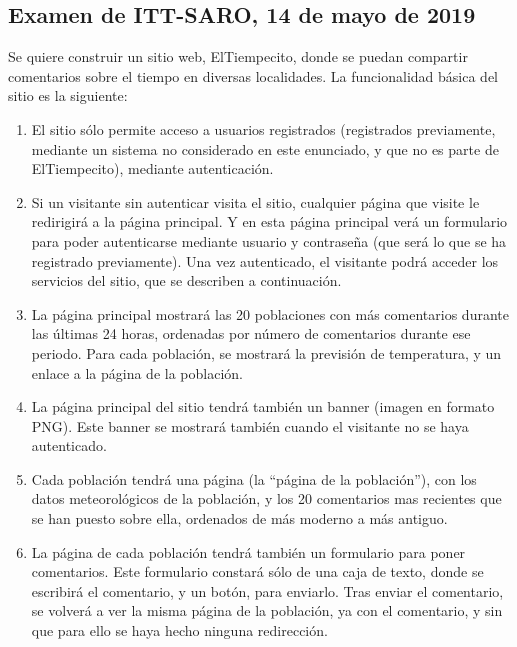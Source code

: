 \subsection{Examen de ITT-SARO, 14 de mayo de 2019}

Se quiere construir un sitio web, ElTiempecito, donde se puedan compartir comentarios sobre el tiempo en diversas localidades. La funcionalidad básica del sitio es la siguiente:

\begin{enumerate}
\item El sitio sólo permite acceso a usuarios registrados (registrados previamente, mediante un sistema no considerado en este enunciado, y que no es parte de ElTiempecito), mediante autenticación.

\item Si un visitante sin autenticar visita el sitio, cualquier página que visite le redirigirá a la página principal. Y en esta página principal verá un formulario para poder autenticarse mediante usuario y contraseña (que será lo que se ha registrado previamente). Una vez autenticado, el visitante podrá acceder los servicios del sitio, que se describen a continuación.

\item La página principal mostrará las 20 poblaciones con más comentarios durante las últimas 24 horas, ordenadas por número de comentarios durante ese periodo. Para cada población, se mostrará la previsión de temperatura, y un enlace a la página de la población. 

\item La página principal del sitio tendrá también un banner (imagen en formato PNG). Este banner se mostrará también cuando el visitante no se haya autenticado.

\item Cada población tendrá una página (la ``página de la población''), con los datos meteorológicos de la población, y los 20 comentarios mas recientes que se han puesto sobre ella, ordenados de más moderno a más antiguo.

\item La página de cada población tendrá también un formulario para poner comentarios. Este formulario constará sólo de una caja de texto, donde se escribirá el comentario, y un botón, para enviarlo. Tras enviar el comentario, se volverá a ver la misma página de la población, ya con el comentario, y sin que para ello se haya hecho ninguna redirección.


\end{enumerate}
